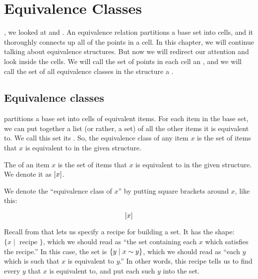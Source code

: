 \documentclass[../../../main.tex]{subfiles}
\begin{document}
\chapter{Equivalence Classes}
\label{ch:equivalence-classes}

, we looked at  and . An equivalence relation partitions a base set into cells, and it thoroughly connects up all of the points in a cell. In this chapter, we will continue talking about equivalence structures. But now we will redirect our attention and look inside the cells. We will call the set of points in each cell an , and we will call the set of all equivalence classes in the structure a .


\section{Equivalence classes}

 partitions a base set into cells of equivalent items. For each item in the base set, we can put together a list (or rather, a set) of all the other items it is equivalent to. We call this set its . So, the equivalence class of any item $x$ is the set of items that $x$ is equivalent to in the given structure. 

\begin{terminology}
  The  of an item $x$ is the set of items that $x$ is equivalent to in the given structure. We denote it as $[x]$.
\end{terminology}

We denote the ``equivalence class of $x$'' by putting square brackets around $x$, like this:

\begin{equation*}
  [x]
\end{equation*}

\begin{aside}
  \begin{remark}
    Recall from  that  lets us specify a recipe for building a set. It has the shape: $\{ x \mid \text{ recipe } \}$, which we should read as ``the set containing each $x$ which satisfies the recipe.'' In this case, the set is $\{ y \mid x \equivalence/ y \}$, which we should read as ``each $y$ which is such that $x$ is equivalent to $y$.'' In other words, this recipe tells us to find every $y$ that $x$ is equivalent to, and put each such $y$ into the set.
  \end{remark}
\end{aside}
\end{document}
